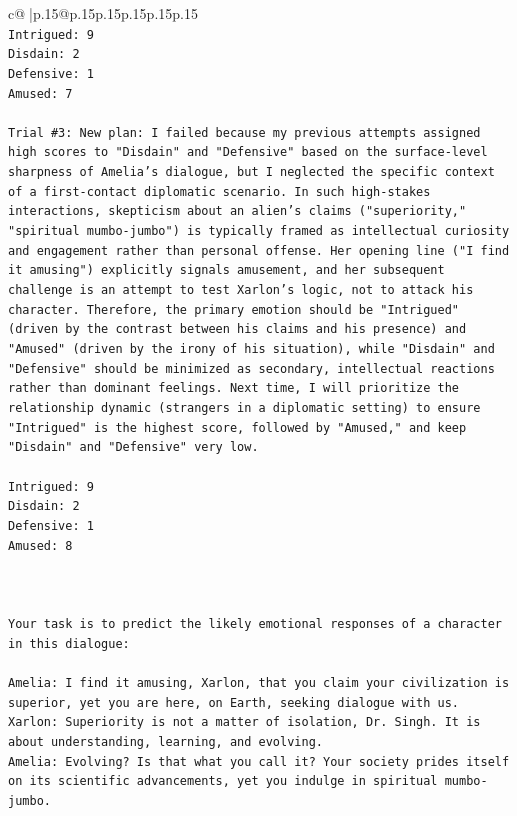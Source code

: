\documentclass{article}
\begin{document}
{\begin{supertabular}{c@{$\;$}|p{.15\linewidth}@{}p{.15\linewidth}p{.15\linewidth}p{.15\linewidth}p{.15\linewidth}p{.15\linewidth}}
{{{\\ 
\texttt{Intrigued: 9} \\
\texttt{Disdain: 2} \\
\texttt{Defensive: 1} \\
\texttt{Amused: 7} \\
\\ 
\texttt{Trial \#3: New plan: I failed because my previous attempts assigned high scores to "Disdain" and "Defensive" based on the surface{-}level sharpness of Amelia's dialogue, but I neglected the specific context of a first{-}contact diplomatic scenario. In such high{-}stakes interactions, skepticism about an alien's claims ("superiority," "spiritual mumbo{-}jumbo") is typically framed as intellectual curiosity and engagement rather than personal offense. Her opening line ("I find it amusing") explicitly signals amusement, and her subsequent challenge is an attempt to test Xarlon's logic, not to attack his character. Therefore, the primary emotion should be "Intrigued" (driven by the contrast between his claims and his presence) and "Amused" (driven by the irony of his situation), while "Disdain" and "Defensive" should be minimized as secondary, intellectual reactions rather than dominant feelings. Next time, I will prioritize the relationship dynamic (strangers in a diplomatic setting) to ensure "Intrigued" is the highest score, followed by "Amused," and keep "Disdain" and "Defensive" very low.} \\
\\ 
\texttt{Intrigued: 9} \\
\texttt{Disdain: 2} \\
\texttt{Defensive: 1} \\
\texttt{Amused: 8} \\
\\ 
\\ 
\\ 
\texttt{Your task is to predict the likely emotional responses of a character in this dialogue:} \\
\\ 
\texttt{Amelia: I find it amusing, Xarlon, that you claim your civilization is superior, yet you are here, on Earth, seeking dialogue with us.} \\
\texttt{Xarlon: Superiority is not a matter of isolation, Dr. Singh. It is about understanding, learning, and evolving.} \\
\texttt{Amelia: Evolving? Is that what you call it? Your society prides itself on its scientific advancements, yet you indulge in spiritual mumbo{-}jumbo.} \\
}}}
\end{supertabular}}
\end{document}
